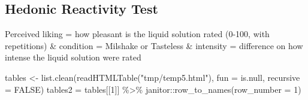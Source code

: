 \documentclass[
]{article}
\newenvironment{Shaded}{\begin{snugshade}}{\end{snugshade}}
\newcommand{\AttributeTok}[1]{\textcolor[rgb]{0.77,0.63,0.00}{#1}}
\newcommand{\ConstantTok}[1]{\textcolor[rgb]{0.00,0.00,0.00}{#1}}
\newcommand{\DecValTok}[1]{\textcolor[rgb]{0.00,0.00,0.81}{#1}}
\newcommand{\FunctionTok}[1]{\textcolor[rgb]{0.00,0.00,0.00}{#1}}
\newcommand{\NormalTok}[1]{#1}
\newcommand{\OtherTok}[1]{\textcolor[rgb]{0.56,0.35,0.01}{#1}}
\newcommand{\SpecialCharTok}[1]{\textcolor[rgb]{0.00,0.00,0.00}{#1}}
\newcommand{\StringTok}[1]{\textcolor[rgb]{0.31,0.60,0.02}{#1}}
\begin{document}
\hfill\break
\hfill\break

\hypertarget{hedonic-reactivity-test}{%
\subsection{Hedonic Reactivity Test}\label{hedonic-reactivity-test}}

Perceived liking = how pleasant is the liquid solution rated (0-100,
with repetitions) \& condition = Milshake or Tasteless \& intensity =
difference on how intense the liquid solution were rated

\hfill\break

\begin{Shaded}
\begin{Highlighting}[]
\NormalTok{tables }\OtherTok{\textless{}{-}} \FunctionTok{list.clean}\NormalTok{(}\FunctionTok{readHTMLTable}\NormalTok{(}\StringTok{"tmp/temp5.html"}\NormalTok{), }\AttributeTok{fun =}\NormalTok{ is.null, }\AttributeTok{recursive =} \ConstantTok{FALSE}\NormalTok{)}
\NormalTok{tables2 }\OtherTok{=}\NormalTok{ tables[[}\DecValTok{1}\NormalTok{]] }\SpecialCharTok{\%\textgreater{}\%}\NormalTok{ janitor}\SpecialCharTok{::}\FunctionTok{row\_to\_names}\NormalTok{(}\AttributeTok{row\_number =} \DecValTok{1}\NormalTok{)}


\end{Highlighting}
\end{Shaded}
\end{document}
